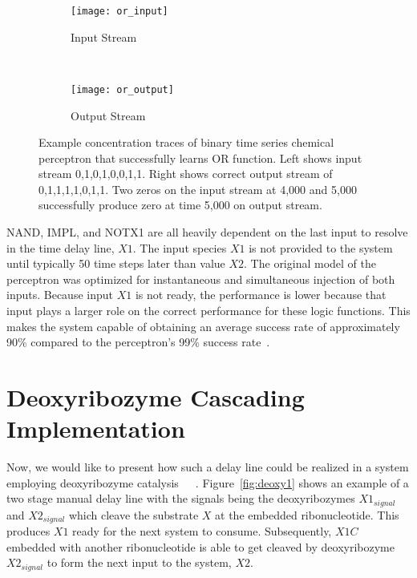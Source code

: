 \begin{figure}[p]
	\centering
	\begin{subfigure}[b]{0.9\textwidth}
	    \centering
		\texttt{[image: or\_input]}
		\caption{Input Stream}
		\label{fig:ORinput}
		\vspace{15mm}
	\end{subfigure}
	\\
	\begin{subfigure}[b]{0.9\textwidth}
	    \centering
		\texttt{[image: or\_output]}
		\caption{Output Stream}
		\label{fig:OROutput}
	\end{subfigure}
	\caption[Concentration Traces for Perceptron/Delay Line Learning Logic OR]{Example concentration traces of binary time series chemical perceptron that successfully learns OR function. Left shows input stream 0,1,0,1,0,0,1,1. Right shows correct output stream of 0,1,1,1,1,0,1,1. Two zeros on the input stream at 4,000 and 5,000 successfully produce zero at time 5,000 on output stream.}
	\label{fig:ORPerceptResults}
\end{figure}

NAND, IMPL, and NOTX1 are all heavily dependent on the last input to resolve in the time delay line, $X1$. The input species $X1$ is not provided to the system until typically 50 time steps later than value $X2$. The original model of the perceptron was optimized for instantaneous and simultaneous injection of both inputs. Because input $X1$ is not ready, the performance is lower because that input plays a larger role on the correct performance for these logic functions. This makes the system capable of obtaining an average success rate of approximately 90\% compared to the perceptron's 99\% success rate~\cite{Banda2014-bp}.

\section{Deoxyribozyme Cascading Implementation}
\label{sec:deoxy}
Now, we would like to present how such a delay line could be realized in a system employing deoxyribozyme catalysis~\cite{Stojanovic2003-eg}~\cite{Stojanovic2000-qx}~\cite{Liu2009-jz}. Figure~\ref{fig:deoxy1} shows an example of a two stage manual delay line with the signals being the deoxyribozymes $X1_{signal}$ and $X2_{signal}$ which cleave the substrate $X$ at the embedded ribonucleotide. This produces $X1$ ready for the next system to consume. Subsequently, $X1C$ embedded with another ribonucleotide is able to get cleaved by deoxyribozyme $X2_{signal}$ to form the next input to the system, $X2$.

